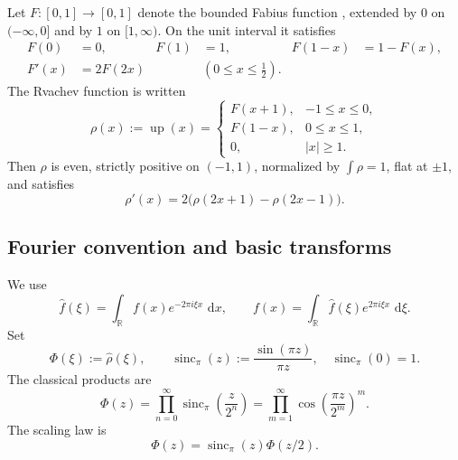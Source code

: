 \documentclass[11pt]{article}
\theoremstyle{definition}
\theoremstyle{remark}
\newcommand{\R}{\mathbb R}
\newcommand{\dd}{\,\mathrm d}
\newcommand{\Up}{\operatorname{up}}
\newcommand{\sincpi}{\operatorname{sinc}_{\pi}}
\begin{document}
Let \(F:[0,1]\to[0,1]\) denote the bounded Fabius function \cite{p1:Fabius1966,p1:AriasTranslation}, extended by \(0\) on
\(( -\infty,0]\) and by \(1\) on \([1,\infty)\).  On the unit interval it satisfies
\begin{align}
 F(0)&=0, & F(1)&=1, & F(1-x)&=1-F(x), \label{p1:eq:F-symmetry}\\
 F'(x)&=2F(2x) &&(0\le x\le\tfrac12). \label{p1:eq:F-diff}
\end{align}
The Rvachev function is written
\begin{equation}
 \rho(x):=\Up(x)=
 \begin{cases}
 F(x+1),&-1\le x\le0,\\
 F(1-x),&0\le x\le1,\\
 0,&|x|\ge1.
 \end{cases}                                                \label{p1:eq:rho-fold}
\end{equation}
Then \(\rho\) is even, strictly positive on \((-1,1)\), normalized by
\(\int\rho=1\), flat at \(\pm1\), and satisfies
\begin{equation}
 \rho'(x)=2\bigl(\rho(2x+1)-\rho(2x-1)\bigr).                \label{p1:eq:rho-dde}
\end{equation}

\subsection{Fourier convention and basic transforms}

We use
\begin{equation}
 \widehat f(\xi)=\int_{\R}f(x)e^{-2\pi i\xi x}\,\dd x,
 \qquad
 f(x)=\int_{\R}\widehat f(\xi)e^{2\pi i\xi x}\,\dd\xi.       \label{p1:eq:fourier-convention}
\end{equation}
Set
\begin{equation}
 \Phi(\xi):=\widehat\rho(\xi),
 \qquad
 \sincpi(z):=\frac{\sin(\pi z)}{\pi z},\quad \sincpi(0)=1. \label{p1:eq:Phi-def}
\end{equation}
The classical products are
\begin{equation}
 \Phi(z)=\prod_{n=0}^{\infty}\sincpi\!\left(\frac{z}{2^n}\right)
 =\prod_{m=1}^{\infty}\cos\!\left(\frac{\pi z}{2^m}\right)^m. \label{p1:eq:Phi-products}
\end{equation}
The scaling law is
\begin{equation}
 \Phi(z)=\sincpi(z)\Phi(z/2).                                \label{p1:eq:Phi-scaling}
\end{equation}
\end{document}
